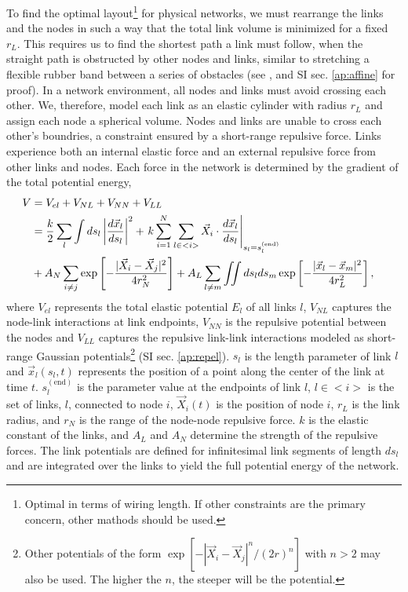 \documentclass[nofootinbib,preprint,floatfix,titlepage,endfloats]{revtex4} %
\begin{document}
To find the optimal layout\footnote{Optimal in terms of wiring length. If other constraints are the primary concern, other mathods should be used.} for physical networks, we must rearrange the links and the nodes in such a way that the total link volume is minimized for a fixed $r_L$. 
This requires us to find the shortest path a link must follow, when the straight path is obstructed by other nodes and links, similar to stretching a flexible rubber band between a series of obstacles (see \cite{novikov1984}, and SI sec. \ref{ap:affine} for proof).
In a network environment, all nodes and links must avoid crossing each other.
We, therefore, model each link as an elastic cylinder with radius $r_L$ and assign 
each node a spherical volume. Nodes and links are unable to cross each other's boundries, a constraint ensured by a short-range repulsive force.  
Links experience both an internal elastic force and an external repulsive force from other links and nodes. 
Each force in the network is determined by the gradient of the total potential energy,  
\begin{align}
    V &= V_{el} + V_{NL} +V_{NN} + V_{LL} \cr 
    &= {k\over 2}\sum_l\int ds_l \left|{d\vec{x}_l\over ds_l} \right|^2 + 
    \left. k\sum_{i=1}^N  \sum_{l\in <i>}  \vec{X}_i \cdot{d\vec{x}_l%
    \over ds_l}\right|_{s_l = s_l^{(\mathrm{end})}}
    \cr
    &+ A_N\sum_{i\ne j}  \exp\left[- {|\vec{X}_i-\vec{X}_j|^2 \over 4r_N^2}\right]+A_L\sum_{l\ne m} \iint ds_lds_m 
    \exp\left[- {|\vec{x}_l-\vec{x}_m|^2 \over 4 r_L^2}\right] ,
 \label{eq:Vfull}
\end{align}
where $V_{el}$ represents the total elastic potential $E_l$ of all links $l$, $V_{NL}$ 
captures the node-link interactions at link endpoints,
$V_{NN}$  is the repulsive potential between the nodes and  $V_{LL}$ captures the repulsive link-link interactions modeled as short-range Gaussian potentials\footnote{Other potentials of the form $\exp[-|\vec{X}_i-\vec{X}_j|^n/(2r)^n]$ with $n>2$ may also be used. The higher the $n$, the steeper will be the potential.}  (SI sec. \ref{ap:repel}). 
$s_l$ is the length parameter of link $l$ and  $\vec{x}_l(s_l,t)$ represents the position of a point along the center of the link at time $t$.
$s_l^\mathrm{(end)}$ is the parameter value at the endpoints of link $l$,
$l\in <i>$ is the set of links, $l$, connected to node $i$, 
$\vec{X}_i(t)$ is the position of node $i$, 
$r_L$ is the link radius, and $r_N$ is the range of the node-node repulsive force. $k$ is the elastic constant of the links, and
$A_L$ and $A_N$ determine the strength of the repulsive forces.
The link potentials are defined for infinitesimal link segments of length $ds_l$ and are integrated over the links to yield the full potential energy of the network. 
\end{document}
